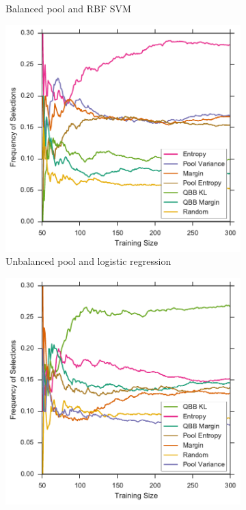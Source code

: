 \begin{figure}[p]
\begin{subfigure}{.5\textwidth}
		\caption{Balanced pool and RBF SVM}
		\label{fig:vstatlas_br_frequencies}
	\end{subfigure}
	\begin{subfigure}{.5\textwidth}
		\centering
		\includegraphics[width=\textwidth]{figures/5_thompson/vstatlas_ul_frequencies}
		\caption{Unbalanced pool and logistic regression}
		\label{fig:vstatlas_ul_frequencies}
	\end{subfigure}%
	\begin{subfigure}{.5\textwidth}
		\centering
		\includegraphics[width=\linewidth]{figures/5_thompson/vstatlas_ur_frequencies}

\end{subfigure}
\end{figure}
